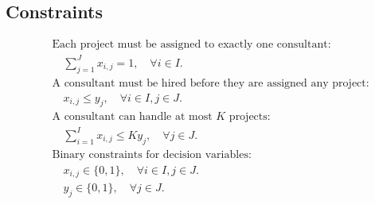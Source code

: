 \documentclass{article}
\begin{document}
\subsection*{Constraints}
\begin{align*}
& \text{Each project must be assigned to exactly one consultant:} \\
& \quad \sum_{j=1}^{J} x_{i,j} = 1, \quad \forall i \in I. \\
& \text{A consultant must be hired before they are assigned any project:} \\
& \quad x_{i,j} \leq y_j, \quad \forall i \in I, j \in J. \\
& \text{A consultant can handle at most } K \text{ projects:} \\
& \quad \sum_{i=1}^{I} x_{i,j} \leq K y_j, \quad \forall j \in J. \\
& \text{Binary constraints for decision variables:} \\
& \quad x_{i,j} \in \{0, 1\}, \quad \forall i \in I, j \in J. \\
& \quad y_j \in \{0, 1\}, \quad \forall j \in J.
\end{align*}
\end{document}
